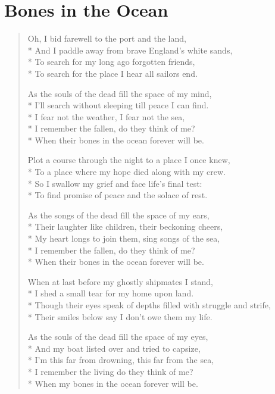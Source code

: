 \documentclass[9pt,twoside]{extarticle}
\newenvironment{xverse}{
	\begin{verse}
	\fontsize{8.5}{10.5}\selectfont
	}
	{
	\end{verse}
	\penalty 0
}
\begin{document}
\section{Bones in the Ocean}
\begin{xverse}
Oh, I bid farewell to the port and the land, \\*
And I paddle away from brave England’s white sands, \\*
To search for my long ago forgotten friends, \\*
To search for the place I hear all sailors end.

As the souls of the dead fill the space of my mind, \\*
I’ll search without sleeping till peace I can find. \\*
I fear not the weather, I fear not the sea, \\*
I remember the fallen, do they think of me? \\*
When their bones in the ocean forever will be.

Plot a course through the night to a place I once knew, \\*
To a place where my hope died along with my crew. \\*
So I swallow my grief and face life’s final test: \\*
To find promise of peace and the solace of rest.

As the songs of the dead fill the space of my ears, \\*
Their laughter like children, their beckoning cheers, \\*
My heart longs to join them, sing songs of the sea, \\*
I remember the fallen, do they think of me? \\*
When their bones in the ocean forever will be.

When at last before my ghostly shipmates I stand, \\*
I shed a small tear for my home upon land. \\*
Though their eyes speak of depths filled with struggle and strife, \\*
Their smiles below say I don’t owe them my life.

As the souls of the dead fill the space of my eyes, \\*
And my boat listed over and tried to capsize, \\*
I’m this far from drowning, this far from the sea, \\*
I remember the living do they think of me? \\*
When my bones in the ocean forever will be.


\end{xverse}
\end{document}
